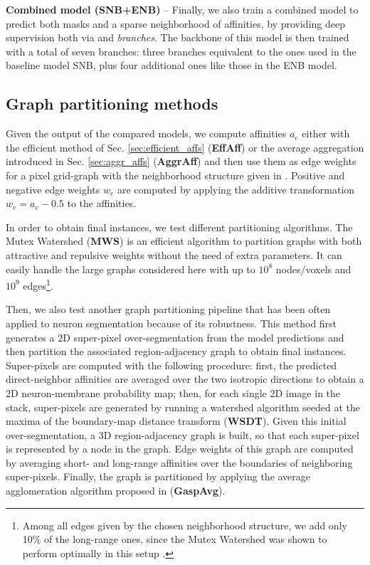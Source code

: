 \textbf{Combined model (SNB+ENB)} -- Finally, we also train a combined model to predict both \maskname masks and a sparse neighborhood of affinities, by providing deep supervision both via \emph{\encBr} and \emph{\sparseBr} \emph{branches}. The backbone of this model is then trained with a total of seven branches: three branches equivalent to the ones used in the baseline model SNB, plus four additional ones like those in the ENB model.  

\subsection{Graph partitioning methods} 
Given the output of the compared models, we compute affinities $a_e$ either with the efficient method of Sec. \ref{sec:efficient_affs} (\textbf{EffAff}) or the average aggregation introduced in Sec. \ref{sec:aggr_affs} (\textbf{AggrAff}) and then use them as edge weights for a pixel grid-graph with the neighborhood structure given in . Positive and negative edge weights $w_e$ are computed by applying the additive transformation $w_e=a_e-0.5$ to the affinities.

In order to obtain final instances, we test different partitioning algorithms.
The Mutex Watershed (\textbf{MWS}) \cite{wolf2018mutex} is an efficient algorithm to partition graphs with both attractive and repulsive weights without the need of extra parameters. It can easily handle the large graphs considered here with up to $10^8$ nodes/voxels and $10^9$ edges\footnote{Among all edges given by the chosen neighborhood structure, we add only 10\% of the long-range ones, since the Mutex Watershed was shown to perform optimally in this setup \cite{bailoni2019generalized,wolf2018mutex}.}. 

Then, we also test another graph partitioning pipeline that has been often applied to neuron segmentation because of its robustness. This method first generates a 2D super-pixel over-segmentation from the model predictions and then partition the associated region-adjacency graph to obtain final instances. Super-pixels are computed with the following procedure: first, the predicted direct-neighbor affinities are averaged over the two isotropic directions to obtain a 2D neuron-membrane probability map; then, for each single 2D image in the stack, super-pixels are generated by running a watershed algorithm seeded at the maxima of the boundary-map distance transform (\textbf{WSDT}). Given this initial over-segmentation, a 3D region-adjacency graph is built, so that each super-pixel is represented by a node in the graph. Edge weights of this graph are computed by averaging short- and long-range affinities over the boundaries of neighboring super-pixels. 
Finally, the graph is partitioned by applying the average agglomeration algorithm proposed in \cite{bailoni2019generalized} (\textbf{GaspAvg}).


